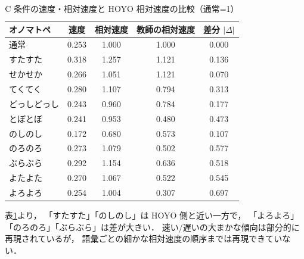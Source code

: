 \begin{table}[H]
  \centering
  \caption{C 条件の速度・相対速度と HOYO 相対速度の比較（通常=1）}
  \label{tab:discussion_c_vs_hoyo_relative_speed}
  \small
  \begin{tabular}{lcccc} \toprule
    \textbf{オノマトペ} & \textbf{速度} & \textbf{相対速度} & \textbf{教師の相対速度} & \textbf{差分 $|\Delta|$} \\ \midrule
    通常 & 0.253 & 1.000 & 1.000 & 0.000 \\
    すたすた & 0.318 & 1.257 & 1.121 & 0.136 \\
    せかせか & 0.266 & 1.051 & 1.121 & 0.070 \\
    てくてく & 0.280 & 1.107 & 0.794 & 0.313 \\
    どっしどっし & 0.243 & 0.960 & 0.784 & 0.177 \\
    とぼとぼ & 0.241 & 0.953 & 0.480 & 0.473 \\
    のしのし & 0.172 & 0.680 & 0.573 & 0.107 \\
    のろのろ & 0.273 & 1.079 & 0.502 & 0.577 \\
    ぶらぶら & 0.292 & 1.154 & 0.636 & 0.518 \\
    よたよた & 0.270 & 1.067 & 0.522 & 0.545 \\
    よろよろ & 0.254 & 1.004 & 0.307 & 0.697 \\ \bottomrule
  \end{tabular}
\end{table}

表\ref{tab:discussion_c_vs_hoyo_relative_speed}より，
「すたすた」「のしのし」は HOYO 側と近い一方で，
「よろよろ」「のろのろ」「ぶらぶら」は差が大きい．
速い/遅いの大まかな傾向は部分的に再現されているが，
語彙ごとの細かな相対速度の順序までは再現できていない．


